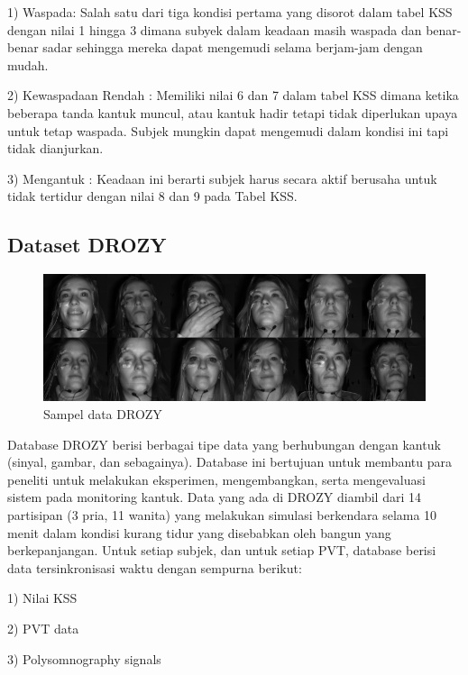1) Waspada: Salah satu dari tiga kondisi pertama yang disorot dalam tabel KSS dengan nilai 1 hingga 3 dimana subyek dalam
keadaan masih waspada dan benar-benar sadar sehingga mereka dapat mengemudi selama berjam-jam dengan mudah.

2) Kewaspadaan Rendah : Memiliki nilai 6 dan 7 dalam tabel KSS dimana ketika beberapa tanda kantuk muncul, atau kantuk
hadir tetapi tidak diperlukan upaya untuk tetap waspada. Subjek mungkin dapat mengemudi dalam kondisi ini tapi tidak dianjurkan.

3) Mengantuk : Keadaan ini berarti subjek harus secara aktif berusaha untuk tidak tertidur dengan nilai 8 dan 9 pada Tabel KSS.

\subsection{Dataset DROZY}

\begin{figure} [H] \centering
      \includegraphics[scale=0.4]{gambar/DROZY.png}
      \caption{Sampel data DROZY \parencite{29}}
      \label{fig:DROZY}
\end{figure}

Database DROZY berisi berbagai tipe data yang berhubungan dengan kantuk (sinyal, gambar, dan sebagainya). Database ini
bertujuan untuk membantu para peneliti untuk melakukan eksperimen, mengembangkan, serta mengevaluasi sistem pada monitoring
kantuk. Data yang ada di DROZY diambil dari 14 partisipan (3 pria, 11 wanita) yang melakukan simulasi berkendara selama
10 menit dalam kondisi kurang tidur yang disebabkan oleh bangun yang berkepanjangan. Untuk setiap subjek, dan untuk setiap
PVT, database berisi data tersinkronisasi waktu dengan sempurna berikut:

1)	Nilai KSS

2)	PVT data

3)	Polysomnography signals

